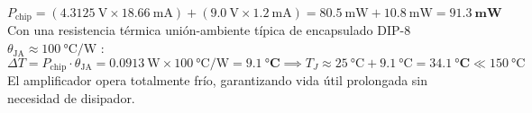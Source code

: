 \documentclass[11pt,letterpaper]{article}
\begin{document}
\begin{enumerate}
    \begin{equation}
    P_{\text{chip}} = (\SI{4.3125}{\volt} \times \SI{18.66}{\milli\ampere}) + (\SI{9.0}{\volt} \times \SI{1.2}{\milli\ampere}) = \SI{80.5}{\milli\watt} + \SI{10.8}{\milli\watt} = \mathbf{\SI{91.3}{\milli\watt}}
    \end{equation}
    Con una resistencia térmica unión-ambiente típica de encapsulado DIP-8 $\theta_{\text{JA}} \approx \SI{100}{\celsius\per\watt}$ \cite{ti_lm358}:
    \begin{equation}
    \Delta T = P_{\text{chip}} \cdot \theta_{\text{JA}} = \SI{0.0913}{\watt} \times \SI{100}{\celsius\per\watt} = \mathbf{\SI{9.1}{\celsius}} \implies T_J \approx \SI{25}{\celsius} + \SI{9.1}{\celsius} = \mathbf{\SI{34.1}{\celsius}} \ll \SI{150}{\celsius}
    \end{equation}
    El amplificador opera totalmente frío, garantizando vida útil prolongada sin necesidad de disipador.
\end{enumerate}
\end{document}
